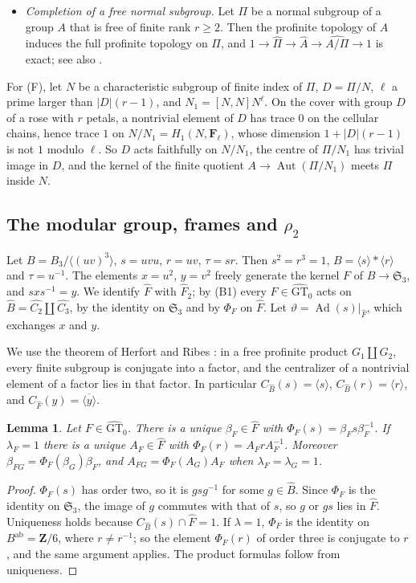 \documentclass[11pt,a4paper]{article}
\theoremstyle{plain}
\newtheorem{lemma}[theorem]{Lemma}
\theoremstyle{definition}
\theoremstyle{remark}
\newcommand{\GTz}{\widehat{\mathrm{GT}}_0}
\newcommand{\Z}{\mathbf Z}
\newcommand{\F}{\mathbf F}
\newcommand{\Fh}{\widehat F}
\newcommand{\Bh}{\widehat B}
\newcommand{\Ad}{\operatorname{Ad}}
\newcommand{\Aut}{\operatorname{Aut}}
\newcommand{\ab}{\mathrm{ab}}
\begin{document}
\begin{itemize}
\item[(F)] \emph{Completion of a free normal subgroup.} Let $\Pi$ be a normal subgroup of a group $A$ that is free
of finite rank $r\ge2$. Then the profinite topology of $A$ induces the full profinite topology on $\Pi$, and
$1\to\widehat\Pi\to\widehat A\to\widehat{A/\Pi}\to1$ is exact; see also \cite{A}.
\end{itemize}
For (F), let $N$ be a characteristic subgroup of finite index of $\Pi$, $D=\Pi/N$, $\ell$ a prime larger than
$|D|(r-1)$, and $N_1=[N,N]N^\ell$. On the cover with group $D$ of a rose with $r$ petals, a nontrivial element of
$D$ has trace $0$ on the cellular chains, hence trace $1$ on $N/N_1=H_1(N,\F_\ell)$, whose dimension
$1+|D|(r-1)$ is not $1$ modulo $\ell$. So $D$ acts faithfully on $N/N_1$, the centre of $\Pi/N_1$ has trivial image
in $D$, and the kernel of the finite quotient $A\to\Aut(\Pi/N_1)$ meets $\Pi$ inside $N$.

\subsection*{The modular group, frames and $\rho_2$}
Let $B=B_3/\langle(uv)^3\rangle$, $s=uvu$, $r=uv$, $\tau=sr$. Then $s^2=r^3=1$, $B=\langle s\rangle*\langle
r\rangle$ and $\tau=u^{-1}$. The elements $x=u^2$, $y=v^2$ freely generate the kernel $F$ of $B\to\mathfrak S_3$,
and $sxs^{-1}=y$. We identify $\Fh$ with $\Fh_2$; by (B1) every $F\in\GTz$ acts on
$\Bh=\widehat{C_2}\amalg\widehat{C_3}$, by the identity on $\mathfrak S_3$ and by $\Phi_F$ on $\Fh$. Let
$\vartheta=\Ad(s)|_{\Fh}$, which exchanges $x$ and $y$.

We use the theorem of Herfort and Ribes \cite{HR}: in a free profinite product $G_1\amalg G_2$, every finite
subgroup is conjugate into a factor, and the centralizer of a nontrivial element of a factor lies in that factor.
In particular $C_{\Bh}(s)=\langle s\rangle$, $C_{\Bh}(r)=\langle r\rangle$, and
$C_{\Fh}(y)=\overline{\langle y\rangle}$.

\begin{lemma}\label{lem:frames}
Let $F\in\GTz$. There is a unique $\beta_F\in\Fh$ with $\Phi_F(s)=\beta_Fs\beta_F^{-1}$. If $\lambda_F=1$ there is
a unique $A_F\in\Fh$ with $\Phi_F(r)=A_FrA_F^{-1}$. Moreover $\beta_{FG}=\Phi_F(\beta_G)\beta_F$, and
$A_{FG}=\Phi_F(A_G)A_F$ when $\lambda_F=\lambda_G=1$.
\end{lemma}

\begin{proof}
$\Phi_F(s)$ has order two, so it is $gsg^{-1}$ for some $g\in\Bh$. Since $\Phi_F$ is the identity on $\mathfrak
S_3$, the image of $g$ commutes with that of $s$, so $g$ or $gs$ lies in $\Fh$. Uniqueness holds because
$C_{\Bh}(s)\cap\Fh=1$. If $\lambda=1$, $\Phi_F$ is the identity on $B^{\ab}=\Z/6$, where $r\ne r^{-1}$; so the
element $\Phi_F(r)$ of order three is conjugate to $r$, and the same argument applies. The product formulas follow
from uniqueness.
\end{proof}
\end{document}
